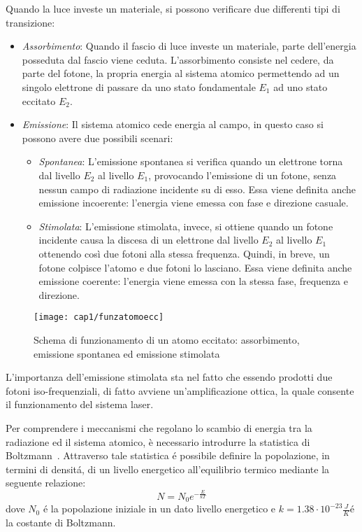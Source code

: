 Quando la luce investe un materiale, si possono verificare due differenti tipi di transizione:
\begin{itemize}
	\item \emph{Assorbimento}: Quando il fascio di luce investe un materiale, parte dell'energia posseduta dal fascio viene ceduta. L'assorbimento consiste nel cedere, da parte del fotone, la propria energia al sistema atomico permettendo ad un singolo elettrone di passare da uno stato fondamentale $E_{1}$ ad uno stato eccitato $E_{2}$.
	\item \emph{Emissione}: Il sistema atomico cede energia al campo, in questo caso si possono avere due possibili scenari:
	\begin{itemize}
		\item \emph{Spontanea}: L'emissione spontanea si verifica quando un elettrone torna dal livello $E_{2}$ al livello $E_{1}$, provocando l'emissione di un fotone, senza nessun campo di radiazione incidente su di esso. Essa viene definita anche emissione incoerente: l'energia viene emessa con fase e direzione casuale.
		\item \emph{Stimolata}: L'emissione stimolata, invece, si ottiene quando un fotone incidente causa la discesa di un elettrone dal livello $E_{2}$ al livello $E_{1}$ ottenendo così due fotoni alla stessa frequenza. Quindi, in breve, un fotone colpisce l'atomo e due fotoni lo lasciano. Essa viene definita anche emissione coerente: l'energia viene emessa con la stessa fase, frequenza e direzione.
	\end{itemize} 
\end{itemize}
\begin{figure}[H]
  \begin{center}
    \texttt{[image: cap1/funzatomoecc]}
    \caption{Schema di funzionamento di un atomo eccitato: assorbimento, emissione spontanea ed emissione stimolata}
    \label{funzatomoecc}
  \end{center}
\end{figure}
L'importanza dell'emissione stimolata sta nel fatto che essendo prodotti due fotoni iso-frequenziali, di fatto avviene un'amplificazione ottica, la quale consente il funzionamento del sistema laser.

Per comprendere i meccanismi che regolano lo scambio di energia tra la radiazione ed il sistema atomico, è necessario introdurre la statistica di Boltzmann~\cite{kasap2012optoelectronics}. Attraverso tale statistica \'e possibile definire la popolazione, in termini di densit\'a, di un livello energetico all'equilibrio termico mediante la seguente relazione:
\begin{equation}
  N=N_0e^{{-\frac{E}{kT}}}
\end{equation}
dove $N_0$ \'e la popolazione iniziale in un dato livello energetico e $k=1.38\cdot10^{-23}\frac{J}{K}$\'e la costante di Boltzmann.
 
